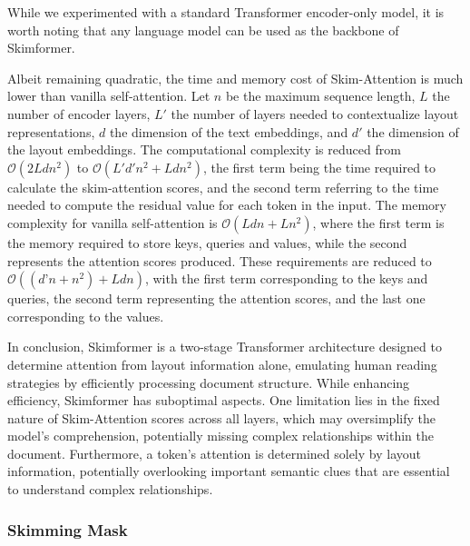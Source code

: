 While we experimented with a standard Transformer encoder-only model, it is worth noting that any language model can be used as the backbone of Skimformer.

Albeit remaining quadratic, the time and memory cost of Skim-Attention is much lower than vanilla self-attention. Let $n$ be the maximum sequence length, $L$ the number of encoder layers, $L'$ the number of layers needed to contextualize layout representations, $d$ the dimension of the text embeddings, and $d'$ the dimension of the layout embeddings. The computational complexity is reduced from $\mathcal{O}(2Ldn^2)$ to $\mathcal{O}(L'd'n^2 + Ldn^2)$, the first term being the time required to calculate the skim-attention scores, and the second term referring to the time needed to compute the residual value for each token in the input. The memory complexity for vanilla self-attention is $\mathcal{O}(Ldn + Ln^2)$, where the first term is the memory required to store keys, queries and values, while the second represents the attention scores produced. These requirements are reduced to $\mathcal{O}((d’n + n^2) + Ldn)$, with the first term corresponding to the keys and queries, the second term representing the attention scores, and the last one corresponding to the values.

In conclusion, Skimformer is a two-stage Transformer architecture designed to determine attention from layout information alone, emulating human reading strategies by efficiently processing document structure. While enhancing efficiency, Skimformer has suboptimal aspects. One limitation lies in the fixed nature of Skim-Attention scores across all layers, which may oversimplify the model's comprehension, potentially missing complex relationships within the document. Furthermore, a token's attention is determined solely by layout information, potentially overlooking important semantic clues that are essential to understand complex relationships.

\subsubsection{Skimming Mask}

